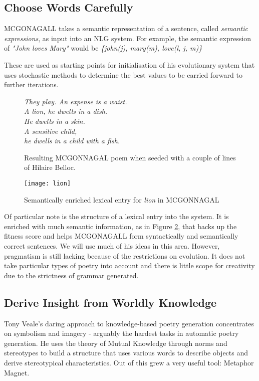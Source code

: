 \subsection{Choose Words Carefully}
\label{sec:mcg}
MCGONAGALL\cite{manurung2004evolutionary} takes a semantic representation of a sentence, called \textit{semantic expressions}, as input into an NLG system. For example, the semantic expression of \textit{"John loves Mary"} would be \textit{\{john(j), mary(m), love(l, j, m)\}}

These are used as starting points for initialisation of his evolutionary system that uses stochastic methods to determine the best values to be carried forward to further iterations.

\begin{figure}[h!]
\centering
\textit{
They play. An expense is a waist.\\
A lion, he dwells in a dish.\\
He dwells in a skin.\\
A sensitive child,\\
he dwells in a child with a fish.\\
}
\caption{Resulting MCGONNAGAL poem when seeded with a couple of lines of Hilaire Belloc.}
\label{fig:mcg}
\end{figure}

\begin{figure}[h!]
\centering
\texttt{[image: lion]}
\caption{Semantically enriched lexical entry for \textit{lion} in MCGONNAGAL}
\label{fig:lion}
\end{figure}

Of particular note is the structure of a lexical entry into the system. It is enriched with much semantic information, as in Figure \ref{fig:lion}, that backs up the fitness score and helps MCGONAGALL form syntactically and semantically correct sentences. We will use much of his ideas in this area. However, pragmatism is still lacking because of the restrictions on evolution. It does not take particular types of poetry into account and there is little scope for creativity due to the strictness of grammar generated. 


\subsection{Derive Insight from Worldly Knowledge}
Tony Veale's daring approach to knowledge-based poetry generation\cite{veale2013less} concentrates on symbolism and imagery - arguably the hardest tasks in automatic poetry generation. He uses the theory of Mutual Knowledge through norms and stereotypes to build a structure that uses various words to describe objects and derive stereotypical characteristics. Out of this grew a very useful tool: Metaphor Magnet\cite{vealespecifying}.

